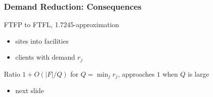 \documentclass[hyperref,dvipsnames,svgnames,compress]{beamer}
\begin{document}
\begin{frame}
  \frametitle{Demand Reduction: Consequences}
  \begin{block}{}
    FTFP to FTFL, 1.7245-approximation    
  \end{block}
  \begin{itemize}
  \item sites into facilities
  \item clients with demand $r_j$
  \end{itemize}

  \begin{block}{}
    Ratio $1 + O(|F| / Q)$ for $Q = \min_j r_j$,
    approaches $1$ when $Q$ is large
  \end{block}
  \begin{itemize}
  \item next slide
  \end{itemize}
\end{frame}
\end{document}
